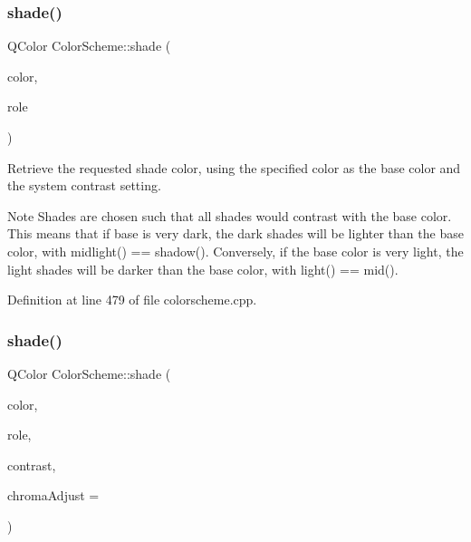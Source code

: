 \mbox{\label{class_color_scheme_a653acbdf70807b7d59cc097f74321c12}} 
\subsubsection{\texorpdfstring{shade()}{shade()}\hspace{0.1cm}{\footnotesize\ttfamily [2/3]}}
{\footnotesize\ttfamily Q\+Color Color\+Scheme\+::shade (\begin{DoxyParamCaption}\item[{const Q\+Color \&}]{color,  }\item[{\hyperlink{class_color_scheme_a666c52f132343e360756a126d558cdd6}{Shade\+Role}}]{role }\end{DoxyParamCaption})\hspace{0.3cm}{\ttfamily [static]}}

Retrieve the requested shade color, using the specified color as the base color and the system contrast setting.

\begin{DoxyNote}{Note}
Shades are chosen such that all shades would contrast with the base color. This means that if base is very dark, the \textquotesingle{}dark\textquotesingle{} shades will be lighter than the base color, with midlight() == shadow(). Conversely, if the base color is very light, the \textquotesingle{}light\textquotesingle{} shades will be darker than the base color, with light() == mid(). 
\end{DoxyNote}


Definition at line 479 of file colorscheme.\+cpp.

\mbox{\label{class_color_scheme_a0b9ddff11e4879c7a99c1a9f63e0877e}} 
\subsubsection{\texorpdfstring{shade()}{shade()}\hspace{0.1cm}{\footnotesize\ttfamily [3/3]}}
{\footnotesize\ttfamily Q\+Color Color\+Scheme\+::shade (\begin{DoxyParamCaption}\item[{const Q\+Color \&}]{color,  }\item[{\hyperlink{class_color_scheme_a666c52f132343e360756a126d558cdd6}{Shade\+Role}}]{role,  }\item[{qreal}]{contrast,  }\item[{qreal}]{chroma\+Adjust = {} }\end{DoxyParamCaption})\hspace{0.3cm}{\ttfamily [static]}}

